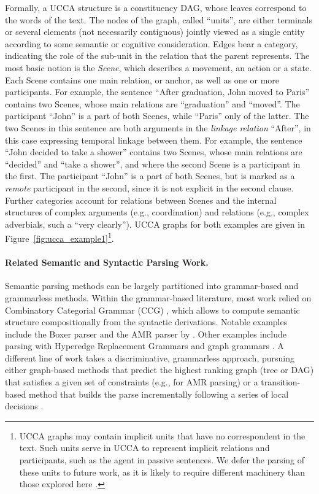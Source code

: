 \documentclass[11pt]{article}
\newcommand{\figref}[1]{Figure~\ref{#1}}
\begin{document}
Formally, a UCCA structure is a constituency DAG, whose leaves correspond to the words of the text. The nodes of the graph, called ``units'', are either terminals or several elements (not necessarily contiguous) jointly viewed as a single entity according to some semantic or cognitive consideration.
Edges bear a category, indicating the role of the sub-unit in the relation that the parent represents. 
The most basic notion is the {\it Scene}, which describes a movement, an action or a state.
Each Scene contains one main relation, or anchor, as well as one or more participants.
For example, the sentence ``After graduation, John moved to Paris'' contains two Scenes, whose main relations are ``graduation'' and ``moved''. The participant ``John'' is a part of both Scenes, while ``Paris'' only of the latter.
The two Scenes in this sentence are both arguments in the \textit{linkage relation} ``After'', in this case expressing temporal linkage between them.
For example, the sentence ``John decided to take a shower'' contains two Scenes, whose main relations are ``decided'' and ``take a shower'', and where the second Scene is a participant in the first.
The participant ``John'' is a part of both Scenes, but is marked as a \textit{remote} participant in
the second, since it is not explicit in the second clause.
Further categories account for relations between Scenes and
the internal structures of complex arguments (e.g., coordination) and relations (e.g., complex adverbials, such a ``very clearly'').
UCCA graphs for both examples are given in \figref{fig:ucca_example1}\footnote{
UCCA graphs may contain implicit units that have no correspondent in the text.
Such units serve in UCCA to represent implicit relations and participants,
such as the agent in passive sentences.
We defer the parsing of these units to future work,
as it is likely to require different machinery than
those explored here \cite{roth2015inducing}.}.
  

\paragraph{Related Semantic and Syntactic Parsing Work.}
Semantic parsing methods can be largely partitioned into grammar-based and grammarless methods.
Within the grammar-based literature, most work relied on Combinatory Categorial Grammar (CCG)
\cite{Steedman:00}, which allows to compute semantic structure compositionally from the
syntactic derivations. Notable examples include the Boxer parser \cite{bos2005towards}
and the AMR parser by .
Other examples include parsing with Hyperedge Replacement Grammars
\cite{jones2012semantics,chiang2013parsing,peng2015synchronous} and
graph grammars \cite{koller2015semantic}.
A different line of work takes a discriminative, grammarless approach,
pursuing either graph-based methods that predict the highest ranking graph
(tree or DAG) that satisfies a given set of constraints
(e.g.,  for AMR parsing)
or a transition-based method that builds the parse incrementally following a series of local
decisions \cite[and much subsequent work]{Nivre03anefficient}.
\end{document}
